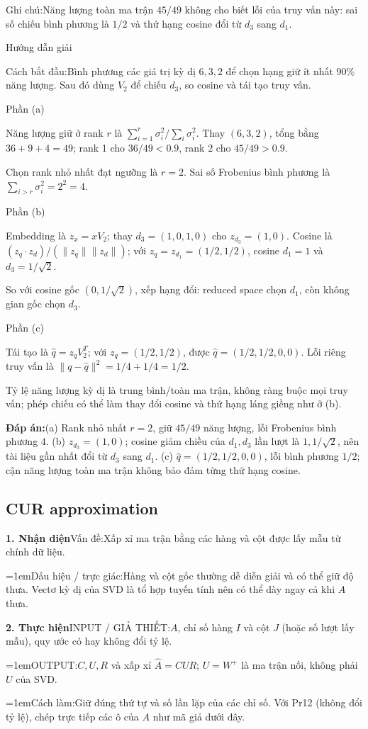 \documentclass[10pt,a4paper,twocolumn]{article}
\makeatletter
\newcommand{\maptag}[1]{\phantomsection\@bsphack\protected@write\@auxout{}{\string\newlabel{#1}{{}{\thepage}{}{\@currentHref}{}}}\@esphack}
\newif\ifexamheadingprinted
\newcommand{\topic}[2]{%
  \global\examheadingprintedfalse\par\subsection{#2}\label{topic:#1}}
\newcommand{\key}[1]{#1:\enspace}
\newcommand{\solutionprompt}[1]{\par\addvspace{1pt}\noindent\key{Cách bắt đầu}#1\par\addvspace{2pt}}
\newcommand{\examnote}[1]{\par\addvspace{2pt}\noindent\key{Ghi chú}#1\par\addvspace{3pt}}
\newcommand{\blocklabel}[1]{\par\noindent#1\par\nobreak}
\newcommand{\answer}[1]{%
  \par\addvspace{3pt}%
  \blocklabel{#1Hướng dẫn giải}}
\newcommand{\finalanswer}[1]{%
  \par\addvspace{3pt}\noindent\textbf{Đáp án:}\nobreak\enspace#1\par}
\newcommand{\guidepart}[1]{%
  \par\addvspace{1.5pt}%
  \blocklabel{Phần #1}}
\newcommand{\algfield}[2]{\par\noindent\hangindent=1em\relax#1:\enspace#2}
\newcommand{\unitfield}[4]{%
  \par\noindent\textbf{#1. #2}\enspace #3:\enspace #4}
\newcommand{\algsummary}[6]{%
  \begingroup\setlength{\parskip}{1pt}%
  \unitfield{1}{Nhận diện}{Vấn đề}{#1}%
  \algfield{Dấu hiệu / trực giác}{#2}%
  \if\relax\detokenize{#3}\relax\else\par\noindent#3\par\fi%
  \unitfield{2}{Thực hiện}{INPUT / GIẢ THIẾT}{#4}%
  \algfield{OUTPUT}{#5}%
  \algfield{Cách làm}{#6}\par\endgroup}
\makeatother
\begin{document}
\examnote{Năng lượng toàn ma trận $45/49$ không cho biết lỗi của truy vấn này: sai số chiếu bình phương là $1/2$ và thứ hạng cosine đổi từ $d_3$ sang $d_1$.}
\answer{\maptag{answer:Pr11}}
\solutionprompt{Bình phương các giá trị kỳ dị $6,3,2$ để chọn hạng giữ ít nhất 90\% năng lượng. Sau đó dùng $V_2$ để chiếu $d_3$, so cosine và tái tạo truy vấn.}
\guidepart{(a)}
\begin{guidesteps}
\item Năng lượng giữ ở rank $r$ là $\sum_{i=1}^r\sigma_i^2/\sum_i\sigma_i^2$. Thay $(6,3,2)$, tổng bằng $36+9+4=49$; rank 1 cho $36/49<0.9$, rank 2 cho $45/49>0.9$.
\item Chọn rank nhỏ nhất đạt ngưỡng là $r=2$. Sai số Frobenius bình phương là $\sum_{i>r}\sigma_i^2=2^2=4$.
\end{guidesteps}
\guidepart{(b)}
\begin{guidesteps}
\item Embedding là $z_x=xV_2$; thay $d_3=(1,0,1,0)$ cho $z_{d_3}=(1,0)$. Cosine là $(z_q\cdot z_d)/(\|z_q\|\|z_d\|)$; với $z_q=z_{d_1}=(1/2,1/2)$, cosine $d_1=1$ và $d_3=1/\sqrt2$.
\item So với cosine gốc $(0,1/\sqrt2)$, xếp hạng đổi: reduced space chọn $d_1$, còn không gian gốc chọn $d_3$.
\end{guidesteps}
\guidepart{(c)}
\begin{guidesteps}
\item Tái tạo là $\hat q=z_qV_2^T$; với $z_q=(1/2,1/2)$, được $\hat q=(1/2,1/2,0,0)$. Lỗi riêng truy vấn là $\|q-\hat q\|^2=1/4+1/4=1/2$.
\item Tỷ lệ năng lượng kỳ dị là trung bình/toàn ma trận, không ràng buộc mọi truy vấn; phép chiếu có thể làm thay đổi cosine và thứ hạng láng giềng như ở (b).
\end{guidesteps}
\finalanswer{(a) Rank nhỏ nhất $r=2$, giữ $45/49$ năng lượng, lỗi Frobenius bình phương $4$. (b) $z_{d_3}=(1,0)$; cosine giảm chiều của $d_1,d_3$ lần lượt là $1,1/\sqrt2$, nên tài liệu gần nhất đổi từ $d_3$ sang $d_1$. (c) $\hat q=(1/2,1/2,0,0)$, lỗi bình phương $1/2$; cận năng lượng toàn ma trận không bảo đảm từng thứ hạng cosine.}
\topic{cur}{CUR approximation}

\algsummary{Xấp xỉ ma trận bằng các hàng và cột được lấy mẫu từ chính dữ liệu.}{Hàng và cột gốc thường dễ diễn giải và có thể giữ độ thưa. Vectơ kỳ dị của SVD là tổ hợp tuyến tính nên có thể dày ngay cả khi $A$ thưa.}{}{$A$, chỉ số hàng $I$ và cột $J$ (hoặc số lượt lấy mẫu), quy ước có hay không đổi tỷ lệ.}{$C,U,R$ và xấp xỉ $\hat A=CUR$; $U=W^+$ là ma trận nối, không phải $U$ của SVD.}{Giữ đúng thứ tự và số lần lặp của các chỉ số. Với Pr12 (không đổi tỷ lệ), chép trực tiếp các ô của $A$ như mã giả dưới đây.}
\end{document}
